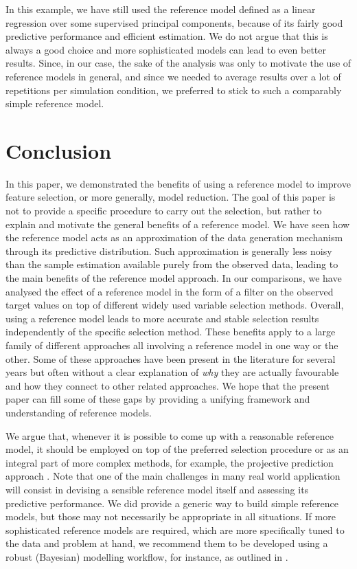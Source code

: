 \documentclass[american,]{article}
\theoremstyle{definition}
\begin{document}
In this example, we have still used the reference model defined as a
linear regression over some supervised principal components, because
of its fairly good predictive performance and efficient estimation. We
do not argue that this is always a good choice and more sophisticated
models can lead to even better results. Since, in our case, the sake
of the analysis was only to motivate the use of reference models in
general, and since we needed to average results over a lot of
repetitions per simulation condition, we preferred to stick to such a
comparably simple reference model.


\hypertarget{conclusion}{%
\section{Conclusion}\label{conclusion}}

In this paper, we demonstrated the benefits of using a reference model
to improve feature selection, or more generally, model reduction. The
goal of this paper is not to provide a specific procedure to carry out
the selection, but rather to explain and motivate the general benefits
of a reference model.  We have seen how the reference model acts as an
approximation of the data generation mechanism through its predictive
distribution. Such approximation is generally less noisy than the
sample estimation available purely from the observed data, leading to
the main benefits of the reference model approach. In our comparisons,
we have analysed the effect of a reference model in the form of a
filter on the observed target values on top of different widely used
variable selection methods. Overall, using a reference model leads to
more accurate and stable selection results independently of the
specific selection method. These benefits apply to a large family of
different approaches all involving a reference model in one way or the
other. Some of these approaches have been present in the literature
for several years \cite[e.g. see][]{vehtari2012survey,paper:projpred}
but often without a clear explanation of \emph{why} they are actually
favourable and how they connect to other related approaches. We hope
that the present paper can fill some of these gaps by providing a
unifying framework and understanding of reference models.

We argue that, whenever it is possible to come up with a reasonable
reference model, it should be employed on top of the preferred
selection procedure or as an integral part of more complex methods,
for example, the projective prediction approach
\citep{paper:projpred}. Note that one of the main challenges in many
real world application will consist in devising a sensible reference
model itself and assessing its predictive performance. We did provide
a generic way to build simple reference models, but those may not
necessarily be appropriate in all situations. If more sophisticated
reference models are required, which are more specifically tuned to
the data and problem at hand, we recommend them to be developed using
a robust (Bayesian) modelling workflow, for instance, as outlined in
\cite{gabry2019visualization}.
\\
\end{document}
